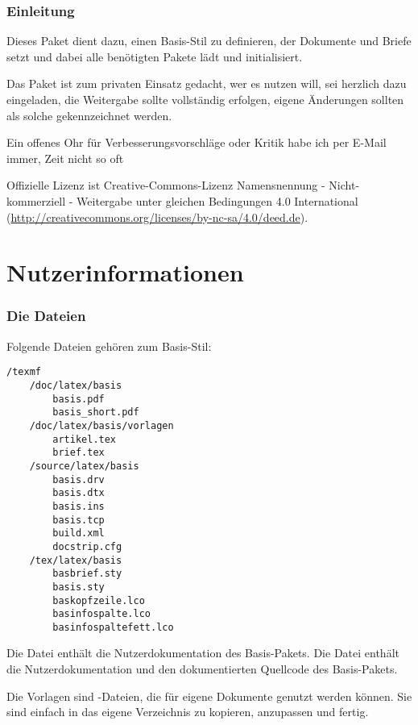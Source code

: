 
\section{Einleitung}

Dieses Paket dient dazu, einen Basis-Stil zu definieren, der Dokumente und Briefe setzt und dabei alle benötigten Pakete lädt und initialisiert.

Das Paket ist zum privaten Einsatz gedacht, wer es nutzen will, sei herzlich dazu eingeladen, die Weitergabe sollte vollständig erfolgen, eigene Änderungen sollten als solche gekennzeichnet werden.

Ein offenes Ohr für Verbesserungsvorschläge oder Kritik habe ich per E-Mail immer, Zeit nicht so oft \smiley

Offizielle Lizenz ist Creative-Commons-Lizenz Namensnennung - Nicht-kommerziell - Weitergabe unter gleichen Bedingungen 4.0 International (\url{http://creativecommons.org/licenses/by-nc-sa/4.0/deed.de}).


\cleardoublepage
\thispagestyle{BASfuss}
\part{Nutzerinformationen}
\cleardoublepage


\section{Die Dateien}
\label{sec:Dateien}

Folgende Dateien gehören zum Basis-Stil:
{\small
\begin{verbatim}
/texmf
	/doc/latex/basis
		basis.pdf
		basis_short.pdf
	/doc/latex/basis/vorlagen
		artikel.tex
		brief.tex
	/source/latex/basis
		basis.drv
		basis.dtx
		basis.ins
		basis.tcp
		build.xml
		docstrip.cfg
	/tex/latex/basis
		basbrief.sty
		basis.sty
		baskopfzeile.lco
		basinfospalte.lco
		basinfospaltefett.lco
\end{verbatim}
}


Die Datei  enthält die Nutzerdokumentation des Basis-Pakets.
Die Datei  enthält die Nutzerdokumentation und den dokumentierten Quellcode des Basis-Pakets.


Die Vorlagen sind -Dateien, die für eigene Dokumente genutzt werden können.
Sie sind einfach in das eigene Verzeichnis zu kopieren, anzupassen und fertig.

